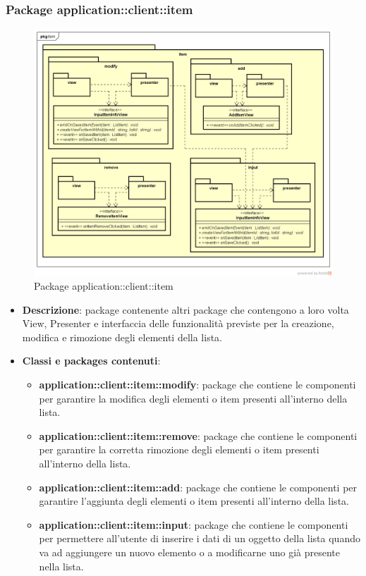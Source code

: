 \subsubsection{Package application::client::item}
\label{Package application::client::item}
\begin{figure}[H]
	\centering
	\includegraphics[scale=0.5]{Sezioni/Packages/App/pck_client_item.png}
	\caption{Package application::client::item}
\end{figure}
\begin{itemize}
	\item \textbf{Descrizione}: package contenente altri package che contengono a loro volta View, Presenter e interfaccia delle funzionalità previste per la creazione, modifica e rimozione degli elementi della lista.
	\item \textbf{Classi e packages contenuti}:
	\begin{itemize}
	\item \textbf{application::client::item::modify}: package che contiene le componenti per garantire la modifica degli elementi o item presenti all'interno della lista.
	\item \textbf{application::client::item::remove}: package che contiene le componenti per garantire la corretta rimozione degli elementi o item presenti all'interno della lista.
	\item \textbf{application::client::item::add}: package che contiene le componenti per garantire l'aggiunta degli elementi o item presenti all'interno della lista.
	\item \textbf{application::client::item::input}: package che contiene le componenti per permettere all'utente di inserire i dati di un oggetto della lista quando va ad aggiungere un nuovo elemento o a modificarne uno già presente nella lista.
\end{itemize}
\end{itemize}

